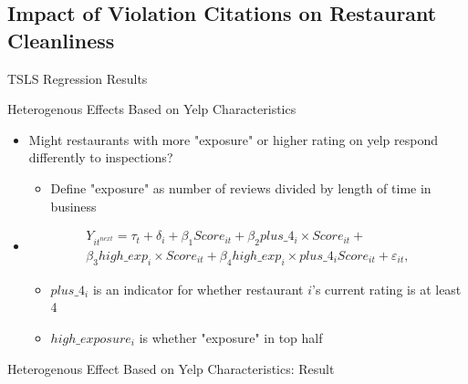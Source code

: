 \documentclass{beamer}
\begin{document}
\subsection{Impact of Violation Citations on Restaurant Cleanliness}
\begin{frame}{TSLS Regression Results}
\begin{table}
\centering
\scalebox{0.6}{}
\end{table}
\end{frame}

\begin{frame}{Heterogenous Effects Based on Yelp Characteristics}
\begin{itemize}
\item Might restaurants with more "exposure" or higher rating on yelp respond differently to inspections?
\begin{itemize}
\item Define "exposure" as number of reviews divided by length of time in business
\end{itemize}
\item \begin{align*}
Y_{it^{next}} = \tau_t + \delta_i +  \beta_1 Score_{it} + \beta_2 plus\_4_i \times Score_{it} + \\
 \beta_3 high\_exp_i \times Score_{it} + \beta_4 high\_exp_i \times plus\_4_i Score_{it} + \varepsilon_{it},
\end{align*}
\begin{itemize}
\item $plus\_4_i$ is an indicator for whether restaurant $i$'s current rating is at least 4
\item $high\_exposure_i$ is whether "exposure" in top half
\end{itemize}
\end{itemize}
\end{frame}

\begin{frame}{Heterogenous Effect Based on Yelp Characteristics: Result}
\begin{table}
\scalebox{0.75}{}
\end{table}
\end{frame}
\end{document}
